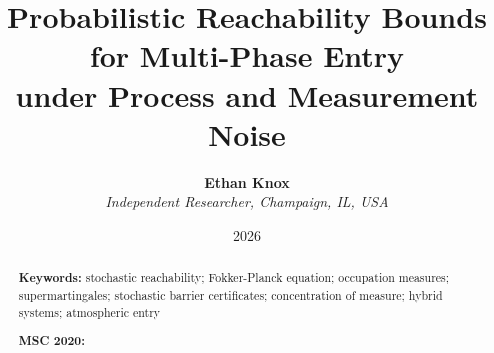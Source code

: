 \documentclass[english,11pt]{extarticle}
\begin{document}
\title{\textbf{Probabilistic Reachability Bounds for Multi-Phase Entry\\
under Process and Measurement Noise}}
\author{\textbf{Ethan Knox}\\
\textit{Independent Researcher, Champaign, IL, USA}}
\date{2026}
\maketitle

\begin{abstract}



\bigskip{}

\textbf{Keywords:} stochastic reachability; Fokker-Planck equation;
occupation measures; supermartingales; stochastic barrier certificates;
concentration of measure; hybrid systems; atmospheric entry

\medskip{}
\noindent\textbf{MSC 2020: }

\end{abstract}
\pagebreak{}

\tableofcontents{}
\pagebreak{}


\pagebreak{}


\pagebreak{}


\pagebreak{}


\pagebreak{}


\pagebreak{}


\pagebreak{}


\pagebreak{}


\pagebreak{}



\pagebreak{}

\appendix




\end{document}
